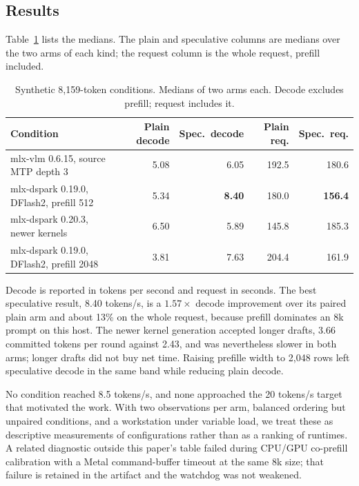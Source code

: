 \documentclass[11pt]{article}
\begin{document}
\subsection{Results}
Table~\ref{tab:conditions} lists the medians. The plain and speculative columns are medians over the two arms of each kind; the request column is the whole request, prefill included.

\begin{table}[H]
\centering
\small
\caption{Synthetic 8{,}159-token conditions. Medians of two arms each. Decode excludes prefill; request includes it.}
\label{tab:conditions}
\begin{tabular}{@{}lrrrr@{}}
\toprule
Condition & Plain decode & Spec.\ decode & Plain req. & Spec.\ req.\\
\midrule
mlx-vlm 0.6.15, source MTP depth 3 & 5.08 & 6.05 & 192.5 & 180.6\\
mlx-dspark 0.19.0, DFlash2, prefill 512 & 5.34 & \textbf{8.40} & 180.0 & \textbf{156.4}\\
mlx-dspark 0.20.3, newer kernels & 6.50 & 5.89 & 145.8 & 185.3\\
mlx-dspark 0.19.0, DFlash2, prefill 2048 & 3.81 & 7.63 & 204.4 & 161.9\\
\bottomrule
\end{tabular}
\end{table}

Decode is reported in tokens per second and request in seconds. The best speculative result, 8.40 tokens/s, is a $1.57\times$ decode improvement over its paired plain arm and about 13\% on the whole request, because prefill dominates an 8k prompt on this host. The newer kernel generation accepted longer drafts, 3.66 committed tokens per round against 2.43, and was nevertheless slower in both arms; longer drafts did not buy net time. Raising prefille width to 2{,}048 rows left speculative decode in the same band while reducing plain decode.

No condition reached 8.5 tokens/s, and none approached the 20 tokens/s target that motivated the work. With two observations per arm, balanced ordering but unpaired conditions, and a workstation under variable load, we treat these as descriptive measurements of configurations rather than as a ranking of runtimes. A related diagnostic outside this paper's table failed during CPU/GPU co-prefill calibration with a Metal command-buffer timeout at the same 8k size; that failure is retained in the artifact and the watchdog was not weakened.
\end{document}
